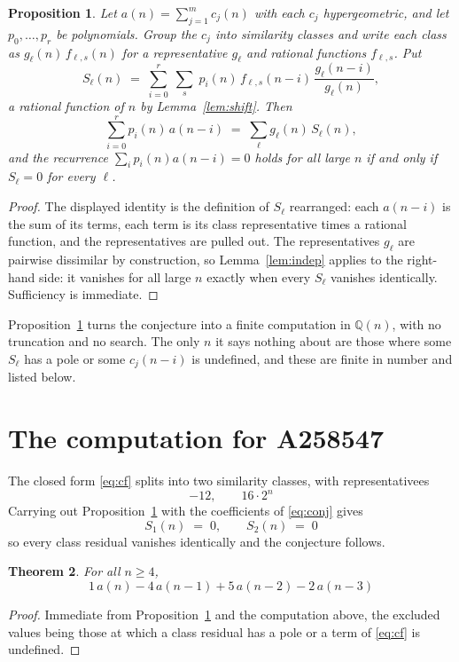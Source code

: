 \documentclass[11pt,a4paper]{article}
\theoremstyle{plain}
\newtheorem{theorem}{Theorem}
\newtheorem{proposition}[theorem]{Proposition}
\theoremstyle{definition}
\begin{document}
\begin{proposition}\label{prop:main}
Let $a(n)=\sum_{j=1}^{m}c_{j}(n)$ with each $c_{j}$ hypergeometric, and let
$p_{0},\dots,p_{r}$ be polynomials. Group the $c_{j}$ into similarity classes and write
each class as $g_{\ell}(n)\,f_{\ell,s}(n)$ for a representative $g_{\ell}$ and rational
functions $f_{\ell,s}$. Put
\[
S_{\ell}(n)\;=\;\sum_{i=0}^{r}\;\sum_{s}\;p_{i}(n)\,f_{\ell,s}(n-i)\,
\frac{g_{\ell}(n-i)}{g_{\ell}(n)} ,
\]
a rational function of $n$ by Lemma~\ref{lem:shift}. Then
\[
\sum_{i=0}^{r}p_{i}(n)\,a(n-i)\;=\;\sum_{\ell}g_{\ell}(n)\,S_{\ell}(n),
\]
and the recurrence $\sum_{i}p_{i}(n)a(n-i)=0$ holds for all large $n$ if and only if
$S_{\ell}=0$ for every $\ell$.
\end{proposition}

\begin{proof}
The displayed identity is the definition of $S_{\ell}$ rearranged: each $a(n-i)$ is the
sum of its terms, each term is its class representative times a rational function, and the
representatives are pulled out. The representatives $g_{\ell}$ are pairwise dissimilar by
construction, so Lemma~\ref{lem:indep} applies to the right-hand side: it vanishes for all
large $n$ exactly when every $S_{\ell}$ vanishes identically. Sufficiency is immediate.
\end{proof}

Proposition~\ref{prop:main} turns the conjecture into a finite computation in
$\mathbb{Q}(n)$, with no truncation and no search. The only $n$ it says nothing about are
those where some $S_{\ell}$ has a pole or some $c_{j}(n-i)$ is undefined, and these are
finite in number and listed below.

\section{The computation for A258547}

The closed form \eqref{eq:cf} splits into two similarity classes, with
representativees
\[
-12,\qquad 16 \cdot 2^{n}
\]
Carrying out Proposition~\ref{prop:main} with the coefficients of \eqref{eq:conj} gives
\[
S_{1}(n)\;=\;0,\qquad S_{2}(n)\;=\;0
\]
so every class residual vanishes identically and the conjecture follows.

\begin{theorem}
For all $n\ge 4$,
\[
1\,a(n) - 4\,a(n-1) + 5\,a(n-2) - 2\,a(n-3)
\]
\end{theorem}

\begin{proof}
Immediate from Proposition~\ref{prop:main} and the computation above, the excluded values
being those at which a class residual has a pole or a term of \eqref{eq:cf} is undefined.
\end{proof}
\end{document}
